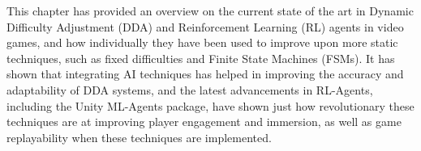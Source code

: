 \begin{spacing}{2.0}
	This chapter has provided an overview on the current state of the art in Dynamic Difficulty Adjustment (DDA) and Reinforcement Learning (RL) agents in video games, and how individually they have been used to
	improve upon more static techniques, such as fixed difficulties and Finite State Machines (FSMs). It has shown that integrating AI techniques has helped in improving the accuracy and adaptability of DDA systems,
	and the latest advancements in RL-Agents, including the Unity ML-Agents package, have shown just how revolutionary these techniques are at improving player engagement and immersion, as well as game replayability
	when these techniques are implemented.


\end{spacing}
\newpage

